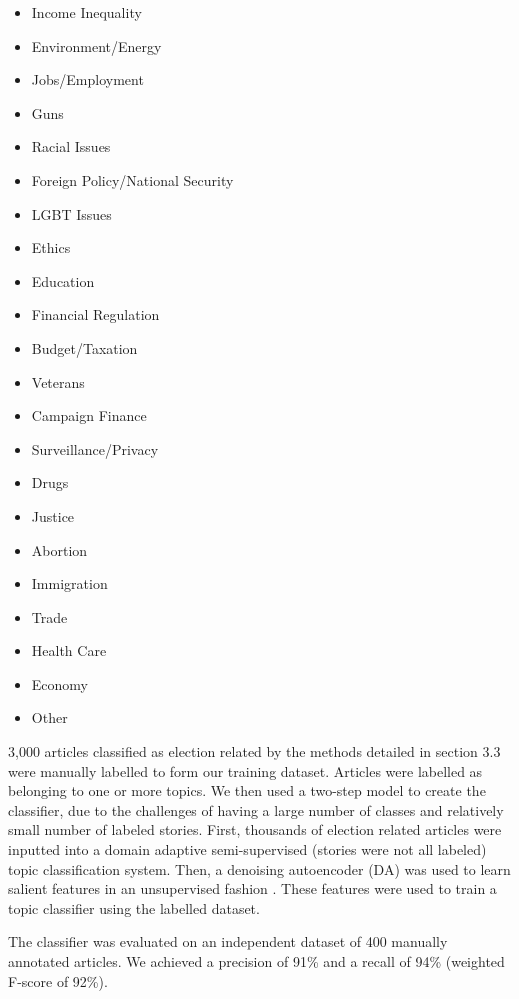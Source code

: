 \begin{multicols}{2}
    \begin{itemize}
    \itemsep-1em 
      \item Income Inequality
      \item Environment/Energy
      \item Jobs/Employment
      \item Guns
      \item Racial Issues
      \item Foreign Policy/National Security
      \item LGBT Issues
      \item Ethics
      \item Education
      \item Financial Regulation
      \item Budget/Taxation
      \item Veterans
      \item Campaign Finance
      \item Surveillance/Privacy
      \item Drugs
      \item Justice
      \item Abortion
      \item Immigration
      \item Trade
      \item Health Care
      \item Economy
      \item Other 
    \end{itemize}
\end{multicols}
 
 3,000 articles classified as election related by the methods detailed in section 3.3 were manually labelled to form our training dataset. Articles were labelled as belonging to one or more topics. We then used a two-step model to create the classifier, due to the challenges of having a large number of classes and relatively small number of labeled stories. First, thousands of election related articles were inputted into a domain adaptive semi-supervised (stories were not all labeled) topic classification system. Then, a denoising autoencoder (DA) was used to learn salient features in an unsupervised fashion \cite{vincent2008extracting}. These features were used to train a topic classifier using the labelled dataset.

The classifier was evaluated on an independent dataset of 400 manually annotated articles. We achieved a precision of 91\% and a recall of 94\% (weighted F-score of 92\%).

